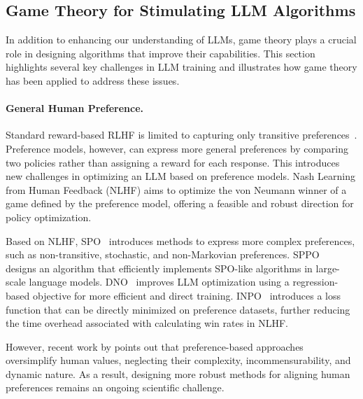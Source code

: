 \subsection{Game Theory for Stimulating LLM Algorithms}\label{sec:game_for_stimulating}

In addition to enhancing our understanding of LLMs, game theory plays a crucial role in designing algorithms that improve their capabilities. This section highlights several key challenges in LLM training and illustrates how game theory has been applied to address these issues.

\paragraph{General Human Preference.} 
Standard reward-based RLHF is limited to capturing only transitive preferences~\cite{NLHF}. 
Preference models, however, can express more general preferences by comparing two policies rather than assigning a reward for each response. 
This introduces new challenges in optimizing an LLM based on preference models.
Nash Learning from Human Feedback (NLHF) aims to optimize the von Neumann winner of a game defined by the preference model, offering a feasible and robust direction for policy optimization. 

Based on NLHF, SPO~\cite{SPO} introduces methods to express more complex preferences, such as non-transitive, stochastic, and non-Markovian preferences. 
SPPO~\cite{SelfPlayPO} designs an algorithm that efficiently implements SPO-like algorithms in large-scale language models. DNO~\cite{DNO} improves LLM optimization using a regression-based objective for more efficient and direct training. INPO~\cite{IiterativeNPO} introduces a loss function that can be directly minimized on preference datasets, further reducing the time overhead associated with calculating win rates in NLHF.

However, recent work by \cite{zhi2024beyond} points out that preference-based approaches oversimplify human values, neglecting their complexity, incommensurability, and dynamic nature. As a result, designing more robust methods for aligning human preferences remains an ongoing scientific challenge.

